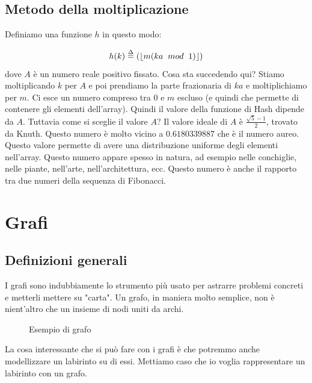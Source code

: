 \documentclass[a4paper]{article}
\begin{document}
\subsection{Metodo della moltiplicazione}

Definiamo una funzione $h$ in questo modo:

\[h(k) \stackrel{\Delta}{=} \left(\floor*{m(ka \; \; mod \; \; 1)}\right) \] 
dove $A$ è un numero reale positivo fissato. Cosa sta succedendo qui? Stiamo moltiplicando $k$ per $A$ e poi prendiamo la parte frazionaria di $ka$ e moltiplichiamo per $m$.
Ci esce un numero compreso tra $0$ e $m$ escluso (e quindi che permette di contenere gli elementi dell'array). Quindi il valore della funzione di Hash dipende da $A$.
Tuttavia come si sceglie il valore $A$? Il valore ideale di $A$ è $\frac{\sqrt{5}-1}{2}$, trovato da Knuth.
Questo numero è molto vicino a $0.6180339887$ che è il numero aureo. Questo valore permette di avere una distribuzione uniforme degli elementi nell'array. Questo numero appare
spesso in natura, ad esempio nelle conchiglie, nelle piante, nell'arte, nell'architettura, ecc. Questo numero è anche il rapporto tra due numeri della sequenza di Fibonacci.

\section{Grafi}

\subsection{Definizioni generali}

I grafi sono indubbiamente lo strumento più usato per astrarre problemi concreti e metterli mettere su "carta". 
Un grafo, in maniera molto semplice, non è nient'altro che un insieme di nodi uniti da archi.

\begin{figure}[H]
\centering
{}
\caption{Esempio di grafo}
\end{figure}
\noindent
La cosa interessante che si può fare con i grafi è che potremmo anche modellizzare un labirinto su di essi. 
Mettiamo caso che io voglia rappresentare un labirinto con un grafo.
\end{document}
